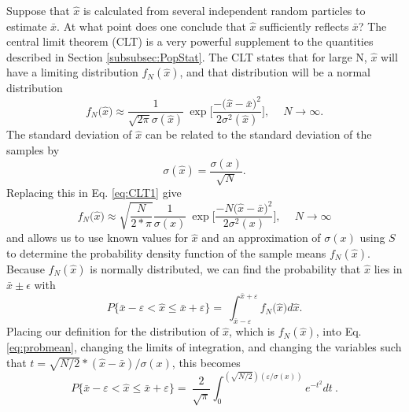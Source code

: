 Suppose that $\hat{x}$ is calculated from several independent random particles
to estimate $\bar{x}$. At what point does one conclude that $\hat{x}$ sufficiently
reflects $\bar{x}$?
The central limit theorem (CLT) \cite{lewis_computational_1984, mcnp_manual_v1}
is a very powerful supplement to the quantities
described in Section \ref{subsubsec:PopStat}. The CLT states that for large N,
$\hat{x}$ will have a limiting distribution $f_N(\hat{x})$, and that distribution will be a
normal distribution
\begin{equation}
  f_N\big(\hat{x}\big) \approx \frac{1}{\sqrt{2\pi} \sigma(\hat{x})}\
           \exp\Bigg[ \frac{-\big( \hat{x}- \bar{x}\big)^2}{2\sigma^2(\hat{x})} \Bigg],\
           \quad N \rightarrow \infty.
  \label{eq:CLT1}
\end{equation}
The standard deviation of $\hat{x}$ can be related to the standard deviation of
the samples by
\begin{equation}
  \sigma(\hat{x}) = \frac{\sigma(x)}{\sqrt{N}}.
\end{equation}
Replacing this in Eq. \eqref{eq:CLT1} give
\begin{equation}
  f_N\big(\hat{x}\big) \approx \sqrt{\frac{N}{2*\pi}} \frac{1}{\sigma(x)}\
           \exp\Bigg[ \frac{-N\big( \hat{x}- \bar{x}\big)^2}{2\sigma^2(x)} \Bigg],\
           \quad N \rightarrow \infty
  \label{eq:CLT2}
\end{equation}
and allows us to use known values for $\hat{x}$ and an approximation of $\sigma(x)$
using $S$ to determine the probability density function of the sample means
$f_N(\hat{x})$. 
Because $f_N(\hat{x})$ is normally distributed, we can find the
probability that $\hat{x}$ lies in $\bar{x} \pm \epsilon$ with
\begin{equation}
  P\big\{\bar{x} - \varepsilon < \hat{x} \leq \bar{x} + \varepsilon\big\} = \
   \int_{\bar{x}-\varepsilon}^{\bar{x}+\varepsilon}f_N\big( \hat{x} \big) d\hat{x}.
   \label{eq:probmean}
\end{equation}
Placing our definition for the distribution of $\hat{x}$, which is $f_N(\hat{x})$, into Eq.
\eqref{eq:probmean}, changing the limits of integration, and changing the
variables such that $t = \sqrt{N/2}*(\hat{x}-\bar{x})/\sigma(x)$, this becomes
\begin{equation}
  P\big\{\bar{x} - \varepsilon < \hat{x} \leq \bar{x} + \varepsilon\big\} = \
  \frac{2}{\sqrt{\pi}} \int_0^{(\sqrt{N/2})(\varepsilon/\sigma(x))} e^{-t^2} dt\:.
\end{equation}
